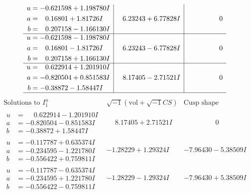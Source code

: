 \documentclass[1p]{elsarticle_modified}
\theoremstyle{definition}
\newcommand{\I}{\sqrt{-1}}
\begin{document}
$$\begin{array}{c|c|c}
\begin{aligned}
u &= -0.621598 + 1.198780 I \\
a &= \phantom{-}0.16801 + 1.81726 I \\
b &= \phantom{-}0.207158 - 1.166130 I\end{aligned}
 & \phantom{-}6.23243 + 6.77828 I & \phantom{-0.000000 } 0 \\ \hline\begin{aligned}
u &= -0.621598 - 1.198780 I \\
a &= \phantom{-}0.16801 - 1.81726 I \\
b &= \phantom{-}0.207158 + 1.166130 I\end{aligned}
 & \phantom{-}6.23243 - 6.77828 I & \phantom{-0.000000 } 0 \\ \hline\begin{aligned}
u &= \phantom{-}0.622914 + 1.201910 I \\
a &= -0.820504 + 0.851583 I \\
b &= -0.38872 - 1.58447 I\end{aligned}
 & \phantom{-}8.17405 - 2.71521 I & \phantom{-0.000000 } 0\\
 \hline 
 \end{array}$$\newpage$$\begin{array}{c|c|c}  
\text{Solutions to }I^u_{1}& \I (\text{vol} + \sqrt{-1}CS) & \text{Cusp shape}\\
 \hline 
\begin{aligned}
u &= \phantom{-}0.622914 - 1.201910 I \\
a &= -0.820504 - 0.851583 I \\
b &= -0.38872 + 1.58447 I\end{aligned}
 & \phantom{-}8.17405 + 2.71521 I & \phantom{-0.000000 } 0 \\ \hline\begin{aligned}
u &= -0.117787 + 0.635374 I \\
a &= -0.234595 - 1.221780 I \\
b &= -0.556422 + 0.759811 I\end{aligned}
 & -1.28229 + 1.29324 I & -7.96430 - 5.38509 I \\ \hline\begin{aligned}
u &= -0.117787 - 0.635374 I \\
a &= -0.234595 + 1.221780 I \\
b &= -0.556422 - 0.759811 I\end{aligned}
 & -1.28229 - 1.29324 I & -7.96430 + 5.38509 I \\ \hline\begin{aligned}

\end{aligned}
\end{array}$$
\end{document}
